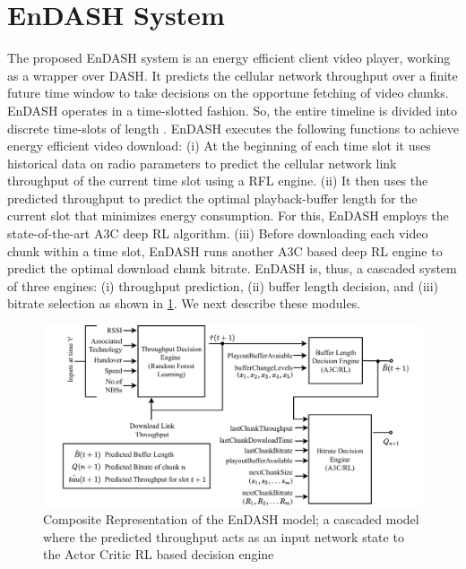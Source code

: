 \section{EnDASH System}\label{sec:chap04:sys_overview}
The proposed EnDASH system is an energy efficient client video player, working as a wrapper over \ac{DASH}. It predicts the cellular network throughput over a finite future time window to take decisions on the opportune fetching of  video chunks.  EnDASH operates in a time-slotted fashion. So, the entire timeline is divided into discrete time-slots of length .
EnDASH executes the following functions to achieve energy efficient video download: (i) At the beginning of each time slot it uses historical data on radio parameters to predict the cellular network link throughput of the current time slot using a \ac{RFL} engine. (ii) It then uses the predicted throughput to predict the optimal playback-buffer length for the current slot that minimizes energy consumption. For this, EnDASH employs the state-of-the-art \ac{A3C} deep \ac{RL} algorithm.  (iii) Before downloading each video chunk within a time slot, EnDASH runs another A3C based deep \ac{RL} engine to predict the optimal download chunk  bitrate.
EnDASH is, thus, a cascaded system of three engines: (i) throughput prediction, (ii) buffer length decision,  and (iii) bitrate selection as shown in \fig\ref{fig:chap04:EnDASH system}. We next describe these modules.
 \begin{figure}[t]
	\centering
	\includegraphics[width = \textwidth]{figures/EnDASH_system_feedloop.pdf}
	\caption{Composite Representation of the EnDASH model; a cascaded model where the predicted throughput acts as an input network state to the Actor Critic \acs{RL} based decision engine}
	\label{fig:chap04:EnDASH system}
\end{figure}

